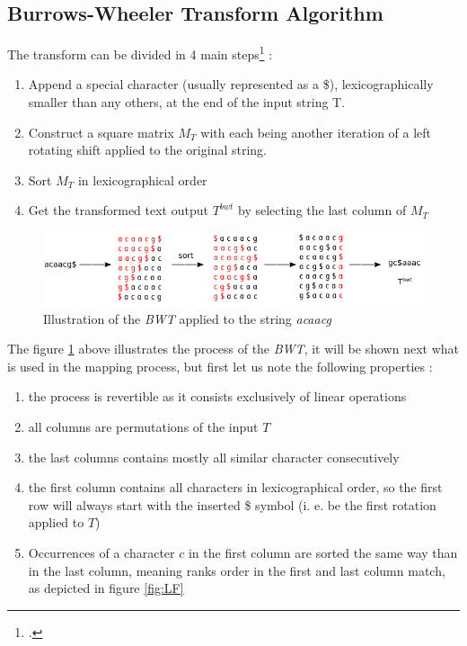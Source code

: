 \subsection{Burrows-Wheeler Transform Algorithm}

The transform can be divided in 4 main steps\footcite{BWT0} :
\begin{enumerate}
\item Append a special character (usually represented as a \$), lexicographically smaller than any others, at the end of the input string \textrm{T}.
\item Construct a square matrix $M_T$ with each being another iteration of a left rotating shift applied to the original string.
\item Sort $M_T$ in lexicographical order
\item Get the transformed text output $T^{bwt}$ by selecting the last column of $M_T$ 
\end{enumerate}

\begin{figure}[h]
\centering
\includegraphics[scale=0.65]{Figures/bwt.png}
\caption{Illustration of the \textsl{BWT} applied to the string \textit{acaacg}}
 \label{fig:bwt}
 \end{figure}
The figure \ref{fig:bwt} above illustrates the process of the \textsl{BWT}, it will be shown next what is used in the mapping process, but first let us note the following properties :
\begin{enumerate}
\item the process is revertible as it consists exclusively of linear operations
\item all columns are permutations of the input $T$
\item the last columns contains mostly all similar character consecutively
\item the first column contains all characters in lexicographical order, so the first row will always start with the inserted \$ symbol (i. e. be the first rotation applied to $T$)
\item Occurrences of a character $c$ in the first column are sorted the same way than in the last column, meaning ranks order in the first and last column match, as depicted in figure \ref{fig:LF}
\end{enumerate}



